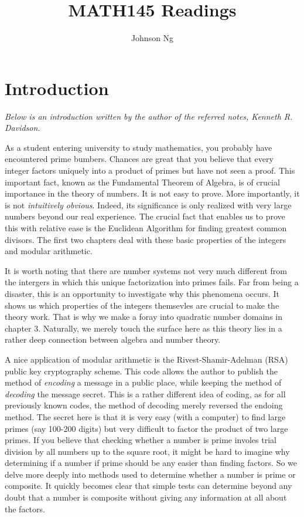 \documentclass[11pt, oneside]{book}
\title{MATH145 Readings}
\author{Johnson Ng}
\theoremstyle{break}
\begin{document}
\maketitle

\chapter*{Introduction}
\textit{Below is an introduction written by the author of the referred notes, Kenneth R. Davidson.}

As a student entering university to study mathematics, you probably have encountered prime bumbers. Chances are great that you believe that every integer factors uniquely into a product of primes but have not seen a proof. This important fact, known as the Fundamental Theorem of Algebra, is of crucial importance in the theory of numbers. It is not easy to prove. More importantly, it is not \textit{intuitively obvious}. Indeed, its significance is only realized with very large numbers beyond our real experience. The crucial fact that enables us to prove this with relative ease is the Euclidean Algorithm for finding greatest common divisors. The first two chapters deal with these basic properties of the integers and modular arithmetic.

It is worth noting that there are number systems not very much different from the intergers in which this unique factorization into primes fails. Far from being a disaster, this is an opportunity to investigate why this phenomena occurs. It shows us which properties of the integers themsevles are crucial to make the theory work. That is why we make a foray into quadratic number domains in chapter 3. Naturally, we merely touch the surface here as this theory lies in a rather deep connection between algebra and number theory.

A nice application of modular arithmetic is the Rivest-Shamir-Adelman (RSA) public key cryptography scheme. This code allows the author to publish the method of \textit{encoding} a message in a public place, while keeping the method of \textit{decoding} the message secret. This is a rather different idea of coding, as for all previously known codes, the method of decoding merely reversed the endoing method. The secret here is that it is very easy (with a computer) to find large primes (say 100-200 digits) but very difficult to factor the product of two large primes. If you believe that checking whether a number is prime involes trial division by all numbers up to the square root, it might be hard to imagine why determining if a number if prime should be any easier than finding factors. So we delve more deeply into methods used to determine whether a number is prime or composite. It quickly becomes clear that simple tests can determine beyond any doubt that a number is composite without giving any information at all about the factors.
\end{document}
